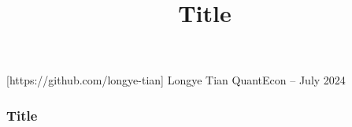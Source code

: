 \documentclass[11pt,xcolor={dvipsnames},hyperref={pdftex,pdfpagemode=UseNone,hidelinks,pdfdisplaydoctitle=true},usepdftitle=false]{beamer}
\begin{document}
\title{Title}

\information
%
[https://github.com/longye-tian]
%
{Longye Tian}
%
{QuantEcon -- July 2024}

\frame{\titlepage}


\begin{frame}
\frametitle{Title}


\end{frame}
\end{document}
